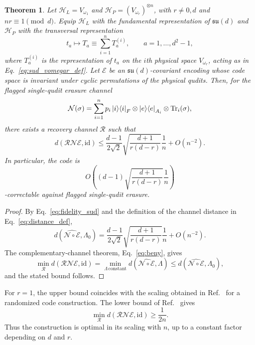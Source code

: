 \documentclass[10pt,twocolumn,superscriptaddress,aps,amsmath,amssymb,citeautoscript,floatfix,prx,longbibliography]{revtex4-2}
\newtheorem{theorem}{Theorem}
\theoremstyle{plain}
\theoremstyle{plain}
\theoremstyle{plain}
\theoremstyle{plain}
\theoremstyle{plain}
\theoremstyle{plain}
\begin{document}
\begin{theorem}\label{thrm:sudscale}
Let $\mathcal H_L=V_{\omega_1}$ and $\mathcal H_P=(V_{\omega_r})^{\otimes n}$, with $r\neq 0,d$ and $nr\equiv 1\pmod d$. Equip $\mathcal H_L$ with the fundamental representation of $\mathfrak{su}(d)$ and $\mathcal H_P$ with the transversal representation
\begin{equation}
    t_a
    \longmapsto
    T_a
    \equiv
    \sum_{i=1}^n T_a^{(i)},
    \qquad
    a=1,\ldots,d^2-1,
\end{equation}
where $T_a^{(i)}$ is the representation of $t_a$ on the $i$th physical space $V_{\omega_r}$, acting as in Eq.~\eqref{eq:sud_vomegar_def}. Let $\mathcal E$ be an $\mathfrak{su}(d)$-covariant encoding whose code space is invariant under cyclic permutations of the physical qudits. Then, for the flagged single-qudit erasure channel
$$
    \mathcal N(\sigma)
    =
    \sum_{i=1}^n
    p_i\ket i\!\bra i_F
    \otimes
    \ket e\!\bra e_{A_i}
    \otimes
    \operatorname{Tr}_i(\sigma),
$$
there exists a recovery channel $\mathcal R$ such that
$$
    d(\mathcal R\mathcal N\mathcal E,\mathrm{id})
    \le
    \frac{d-1}{2\sqrt 2}
    \sqrt{\frac{d+1}{r(d-r)}}
    \frac1n
    +
    O(n^{-2}) .
$$
In particular, the code is
$$
    O\left(
    (d-1)
    \sqrt{\frac{d+1}{r(d-r)}}
    \frac1n
    \right)
$$
-correctable against flagged single-qudit erasure.
\end{theorem}

\begin{proof}
By Eq.~\eqref{eq:fidelity_sud} and the definition of the channel distance in Eq.~\eqref{eq:distance_def},
$$
    d\left(\widehat{\mathcal N\circ\mathcal E},\Lambda_0\right)
    =
    \frac{d-1}{2\sqrt 2}
    \sqrt{\frac{d+1}{r(d-r)}}
    \frac1n
    +
    O(n^{-2}) .
$$
The complementary-channel theorem, Eq.~\eqref{eq:beny}, gives
$$
    \min_{\mathcal R}
    d(\mathcal R\mathcal N\mathcal E,\mathrm{id})
    =
    \min_{\Lambda\,\mathrm{constant}}
    d\left(\widehat{\mathcal N\circ\mathcal E},\Lambda\right)
    \le
    d\left(\widehat{\mathcal N\circ\mathcal E},\Lambda_0\right),
$$
and the stated bound follows.
\end{proof}

For $r=1$, the upper bound coincides with the scaling obtained in Ref.~\cite{Kong2022} for a randomized code construction. The lower bound of Ref.~\cite{Faist2020} gives
$$
    \min_{\mathcal R}
    d(\mathcal R\mathcal N\mathcal E,\mathrm{id})
    \ge
    \frac{1}{2n}.
$$
Thus the construction is optimal in its scaling with $n$, up to a constant factor depending on $d$ and $r$.
\end{document}
